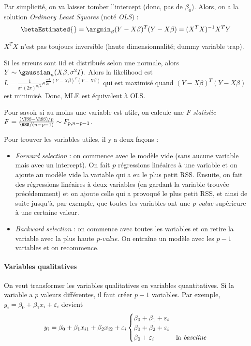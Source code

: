         Par simplicité, on va laisser tomber l'intercept (donc, pas de \(\beta_0\)). Alors, on a la solution \textit{Ordinary Least Squares} (noté \textit{OLS}) :
        \[
            \betaEstimated{} = \argmin_\beta (Y - X\beta)^T(Y - X\beta) = (X^TX)^{-1}X^TY
        \]

        \begin{remarque}
            \(X^TX\) n'est pas toujours inversible (haute dimensionnalité; dummy variable trap).
        \end{remarque}

        Si les erreurs sont iid et distribués selon une normale, alors \(Y \sim \gaussian_n(X\beta, \sigma^2I)\). Alors la likelihood est \(L = \frac{1}{\sigma^2 (2\pi)^{n/2}}e^{\frac{-1}{2\sigma^2}(Y - X\beta)^T(Y - X\beta)}\) qui est maximisé quand \((Y - X\beta)^T(Y - X\beta)\) est minimisé. Donc, MLE est équivalent à OLS.

        Pour savoir si au moins une variable est utile, on calcule une \textit{F-statistic} \(F = \frac{(\TSS - \RSS)/p}{\RSS/(n-p-1)} \sim F_{p,n-p-1}\).

        Pour trouver les variables utiles, il y a deux façons :
        \begin{itemize}
            \item \textit{Forward selection} : on commence avec le modèle vide (sans aucune variable mais avec un intercept). On fait \(p\) régressions linéaires à une variable et on ajoute au modèle vide la variable qui a eu le plus petit RSS. Ensuite, on fait des régressions linéaires à deux variables (en gardant la variable trouvée précédemment) et on ajoute celle qui a provoqué le plus petit RSS, et ainsi de suite jusqu'à, par exemple, que toutes les variables ont une \textit{p-value} supérieure à une certaine valeur.
            \item \textit{Backward selection} : on commence avec toutes les variables et on retire la variable avec la plus haute \textit{p-value}. On entraîne un modèle avec les \(p - 1\) variables et on recommence.
        \end{itemize}

        \paragraph{Variables qualitatives}
        On veut transformer les variables qualitatives en variables quantitatives. Si la variable a \(p\) valeurs différentes, il faut créer \(p - 1\) variables. Par exemple, \(y_i = \beta_0 + \beta_1 x_i + \varepsilon_i\) devient \[y_i = \beta_0 + \beta_1 x_{i1} + \beta_2 x_{i2} + \varepsilon_i \begin{cases}
            \beta_0 + \beta_1 + \varepsilon_i\\
            \beta_0 + \beta_2 + \varepsilon_i\\
            \beta_0 + \varepsilon_i & \text{la \textit{baseline}\index{Baseline}}\\
        \end{cases}\]

